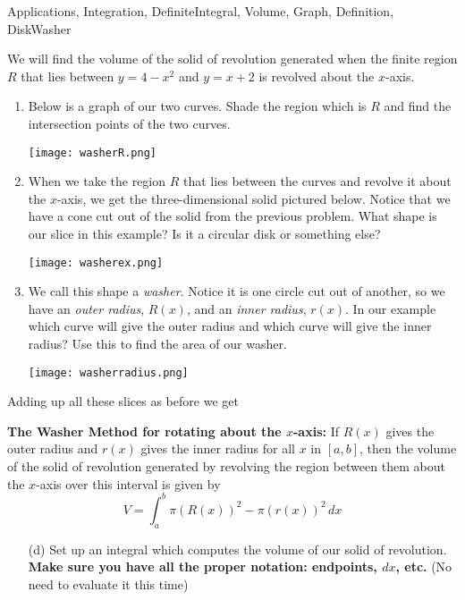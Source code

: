\begin{tagblock}{Applications, Integration, DefiniteIntegral, Volume, Graph, Definition, DiskWasher}
\begin{question}
	


We will find the volume of the solid of revolution generated when the finite region $R$ that lies between $y=4-x^2$ and $y=x+2$ is revolved about the $x$-axis.
\begin{enumerate}
\item Below is a graph of our two curves.  Shade the region which is $R$ and find the intersection points of the two curves.

\texttt{[image: washerR.png]}

\item When we take the region $R$ that lies between the curves and revolve it about the $x$-axis, we get the three-dimensional solid pictured below.  Notice that we have a cone cut out of the solid from the previous problem.  What shape is our slice in this example?  Is it a circular disk or something else?

\texttt{[image: washerex.png]}

\item We call this shape a \emph{washer}.  Notice it is one circle cut out of another, so we have an \emph{outer radius}, $R(x)$, and an \emph{inner radius}, $r(x)$.  In our example which curve will give the outer radius and which curve will give the inner radius? Use this to find the area of our washer.  

\texttt{[image: washerradius.png]}


\end{enumerate}

Adding up all these slices as before we get

\textbf{The Washer Method for rotating about the $x$-axis:}
If $R(x)$ gives the outer radius and $r(x)$ gives the inner radius for all $x$ in $[a,b]$, then the volume of the solid of revolution generated by revolving the region between them about the $x$-axis over this interval is given by
\[V = \int_a^b \pi(R(x))^2 - \pi (r(x))^2 \, dx\]
\begin{enumerate}
\item[(d)]  Set up an integral which computes the volume of our  solid of revolution.   \textbf{Make sure you have all the proper notation: endpoints, $dx$, etc.}   (No need to evaluate it this time)
\end{enumerate}




\end{question}
\end{tagblock}

